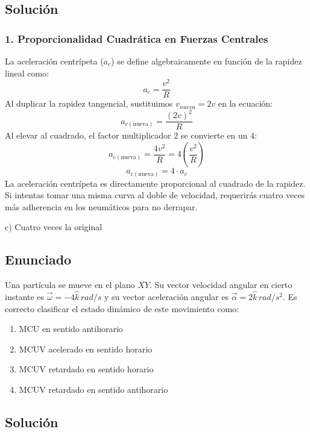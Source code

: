 \documentclass[12pt, a4paper]{article}
\begin{document}
\subsection*{Solución}

\subsubsection*{1. Proporcionalidad Cuadrática en Fuerzas Centrales}
La aceleración centrípeta ($a_c$) se define algebraicamente en función de la rapidez lineal como:
$$ a_c = \frac{v^2}{R} $$
Al duplicar la rapidez tangencial, sustituimos $v_{nueva} = 2v$ en la ecuación:
$$ a_{c(\text{nueva})} = \frac{(2v)^2}{R} $$
Al elevar al cuadrado, el factor multiplicador $2$ se convierte en un $4$:
$$ a_{c(\text{nueva})} = \frac{4v^2}{R} = 4 \left( \frac{v^2}{R} \right) $$
$$ a_{c(\text{nueva})} = 4 \cdot a_c $$
La aceleración centrípeta es directamente proporcional al cuadrado de la rapidez. Si intentas tomar una misma curva al doble de velocidad, requerirás cuatro veces más adherencia en los neumáticos para no derrapar.

\begin{tcolorbox}[colback=green!5!white, colframe=green!50!black, title=Respuesta Final]
\centering \Large c) Cuatro veces la original
\end{tcolorbox}

\newpage

\subsection*{Enunciado}
Una partícula se mueve en el plano $XY$. Su vector velocidad angular en cierto instante es $\vec{\omega} = -4\hat{k} \, \si{rad/s}$ y su vector aceleración angular es $\vec{\alpha} = 2\hat{k} \, \si{rad/s^2}$. Es correcto clasificar el estado dinámico de este movimiento como:
\begin{enumerate}[label=\alph*)]
    \item MCU en sentido antihorario
    \item MCUV acelerado en sentido horario
    \item MCUV retardado en sentido horario
    \item MCUV retardado en sentido antihorario
\end{enumerate}

\subsection*{Solución}
\end{document}
